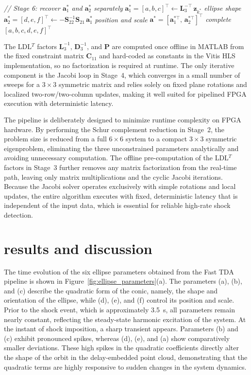 \documentclass[colorlinks,upint,subscriptcorrection,varvw,hyphenate,balance,greek,russian,vietnamese,german]{asmeconf} %
\begin{document}
\begin{algorithm}[h]
\begin{algorithmic}[1]
		\Statex \textit{// Stage 6: recover $\mathbf{a}_1^*$
			and $\mathbf{a}_2^*$ separately}
		\State $\mathbf{a}_1^* = [a,b,c]^\top \leftarrow
		\mathbf{L}_3^{-\top}\,\mathbf{z}_{k^*}$
		\hfill \textit{ellipse shape}
		\State $\mathbf{a}_2^* = [d,e,f]^\top \leftarrow
		-\mathbf{S}_{22}^{-1}
		\mathbf{S}_{21}\,\mathbf{a}_1^*$
		\hfill \textit{position and scale}
		\State \Return
		$\mathbf{a}^*\!=\!
		[\mathbf{a}_1^{*\top},\,
		\mathbf{a}_2^{*\top}]^\top$
		\hfill \textit{complete $[a,b,c,d,e,f]^\top$}
		
	\end{algorithmic}
\end{algorithm}


The LDL$^T$ factors $\mathbf{L}_3^{-1}$, $\mathbf{D}_3^{-1}$, and $\mathbf{P}$ are computed once offline in MATLAB from the fixed constraint matrix $\mathbf{C}_{11}$ and hard-coded as constants in the Vitis HLS implementation, so no factorization is required at runtime. The only iterative component is the Jacobi loop in Stage~4, which converges in a small number of sweeps for a $3\times3$ symmetric matrix and relies solely on fixed plane rotations and localized two-row/two-column updates, making it well suited for pipelined FPGA execution with deterministic latency.

The pipeline is deliberately designed to minimize runtime complexity on FPGA hardware. By performing the Schur complement reduction in Stage~2, the problem size is reduced from a full $6\times6$ system to a compact $3\times3$ symmetric eigenproblem, eliminating the three unconstrained parameters analytically and avoiding unnecessary computation. The offline pre-computation of the LDL$^T$ factors in Stage~3 further removes any matrix factorization from the real-time path, leaving only matrix multiplications and the cyclic Jacobi iterations. Because the Jacobi solver operates exclusively with simple rotations and local updates, the entire algorithm executes with fixed, deterministic latency that is independent of the input data, which is essential for reliable high-rate shock detection.

\section{results and discussion}

The time evolution of the six ellipse parameters obtained from the Fast TDA pipeline is shown in Figure~\ref{fig:ellipse_parameters}(a). The parameters (a), (b), and (c) describe the quadratic form of the conic, namely, the shape and orientation of the ellipse, while (d), (e), and (f) control its position and scale. Prior to the shock event, which is approximately 3.5~s, all parameters remain nearly constant, reflecting the steady-state harmonic excitation of the system. At the instant of shock imposition, a sharp transient appears. Parameters (b) and (c) exhibit pronounced spikes, whereas (d), (e), and (a) show comparatively smaller deviations. These high spikes in the quadratic coefficients directly alter the shape of the orbit in the delay-embedded point cloud, demonstrating that the quadratic terms are highly responsive to sudden changes in the system dynamics.
\end{document}
